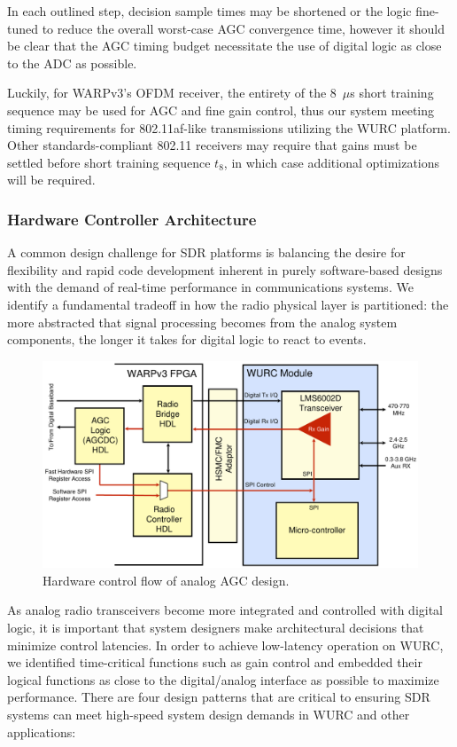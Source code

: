 	In each outlined step, decision sample times may be shortened or the logic fine-tuned to reduce the overall worst-case \ac{AGC} convergence time, however it should be clear that the \ac{AGC} timing budget necessitate the use of digital logic as close to the \ac{ADC} as possible.
	
	Luckily, for WARPv3's \ac{OFDM} receiver, the entirety of the 8~$\mu$s short training sequence may be used for \ac{AGC} and fine gain control, thus our system meeting timing requirements for 802.11af-like transmissions utilizing the \ac{WURC} platform.
	Other standards-compliant 802.11 receivers may require that gains must be settled before short training sequence $t_8$, in which case additional optimizations will be required.


\subsubsection{Hardware Controller Architecture}
\label{sec_agc_hw_controller}

	A common design challenge for \ac{SDR} platforms is balancing the desire for flexibility and rapid code development inherent in purely software-based designs with the demand of real-time performance in communications systems.
	We identify a fundamental tradeoff in how the radio physical layer is partitioned: the more abstracted that signal processing becomes from the analog system components, the longer it takes for digital logic to react to events.

\begin{figure}[t] %
\centering
\includegraphics[width=0.9\linewidth]{./figs/agc/agc_block_diagram}
\caption{Hardware control flow of analog AGC design.}
\label{fig_agc_block_diagram}
\end{figure}

	As analog radio transceivers become more integrated and controlled with digital logic, it is important that system designers make architectural decisions that minimize control latencies.
	In order to achieve low-latency operation on \ac{WURC}, we identified time-critical functions such as gain control and embedded their logical functions as close to the digital/analog interface as possible to maximize performance.
	There are four design patterns that are critical to ensuring \ac{SDR} systems can meet high-speed system design demands in \ac{WURC} and other applications:

